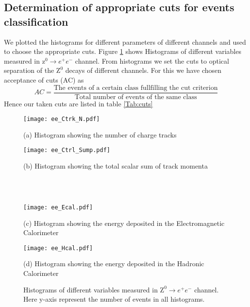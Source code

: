 \subsection{Determination of appropriate cuts for events classification}
We plotted the histograms for different parameters of different channels and used to choose the appropriate cuts. Figure \ref{Fig:histograms} shows Histograms of different variables measured in $  \text{z}^0\rightarrow e^+e^- $ channel. From histograms we set the cuts to optical separation of the $ \text{Z}^0 $ decays of different channels. For this we have chosen acceptance of cuts (AC) as
\begin{equation}
AC= \frac{\text{The events of a certain class fullfilling the cut criterion}}{\text{Total number of events of the same class}}
\end{equation}
Hence our taken cuts are listed in table \ref{Tab:cuts}

  
\begin{figure}[H]   
	\begin{minipage}[t]{0.5\textwidth}
		\texttt{[image: ee\_Ctrk\_N.pdf]}
		\begin{center}
			{(a) Histogram showing the number of charge tracks}
		\end{center}
	\end{minipage} \quad
	\begin{minipage}[t]{0.5\textwidth}
		\texttt{[image: ee\_Ctrl\_Sump.pdf]}
		\begin{center}
			{(b) Histogram showing the total scalar sum of track momenta}
		\end{center}
	\end{minipage}\\\\
	
	
	\begin{minipage}[t]{0.5\textwidth}
		\texttt{[image: ee\_Ecal.pdf]}
		\begin{center}
			{(c) Histogram showing the energy deposited in the Electromagnetic Calorimeter}
		\end{center}
	\end{minipage} \quad
	\begin{minipage}[t]{0.5\textwidth}
		\texttt{[image: ee\_Hcal.pdf]}
		\begin{center}
			{(d) Histogram showing the energy deposited in the Hadronic Calorimeter}
		\end{center}
	\end{minipage}
	\caption{Histograms of different variables measured in $  \text{Z}^0\rightarrow e^+e^- $ channel. Here y-axis represent the number of events in all histograms.}
\label{Fig:histograms}	
\end{figure}

